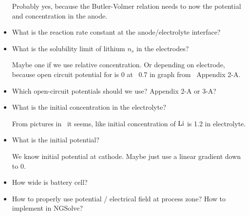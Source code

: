 \documentclass[a4paper,11pt]{scrartcl}
\newcommand*{\Li}{\ce{Li}}
\begin{document}
\begin{itemize}
  Probably yes, because the Butler-Volmer relation needs to now the potential
  and concentration in the anode.

\item What is the reaction rate constant at the anode/electrolyte interface?

\item What is the solubility limit of lithium $n_s$ in the electrodes?

  Maybe one if we use relative concentration. Or depending on electrode, because
  open circuit potential for  is 0 at ~0.7 in graph from~\cite{doyle95} Appendix 2-A.

\item Which open-circuit potentials should we use? Appendix 2-A or 3-A?

\item What is the initial concentration in the electrolyte?

  From pictures in~\cite{garcia05} it seems, like initial concentration of $\Li$
  is \num{1.2} in electrolyte.

\item What is the initial potential?

  We know initial potential at cathode. Maybe just use a linear gradient down to 0.

\item How wide is battery cell?

\item How to properly use potential / electrical field at process zone? How to
  implement in NGSolve?

\end{itemize}

{}

\end{document}
